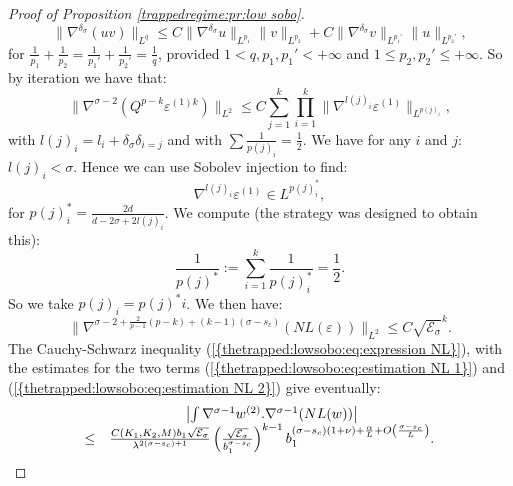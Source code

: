 \documentclass[11pt,a4paper,reqno]{amsart}
\theoremstyle{remark}
\numberwithin{equation}{section}
\begin{document}
\begin{proof}[Proof of Proposition \ref{trappedregime:pr:low sobo}]
$$
\parallel \nabla^{\delta_{\sigma}}(uv)\parallel_{L^q}\leq C \parallel \nabla^{\delta_{\sigma}}u\parallel_{L^{p_1}}\parallel v\parallel_{L^{p_2}}+C\parallel \nabla^{\delta_{\sigma}}v\parallel_{L^{p_1'}}\parallel u\parallel_{L^{p_2'}} ,
$$
for $\frac{1}{p_1}+\frac{1}{p_2}=\frac{1}{p_1'}+\frac{1}{p_2'}=\frac{1}{q}$, provided $1<q,p_1,p_1'<+\infty$ and $1\leq p_2,p_2'\leq +\infty$. So by iteration we have that:
$$
\parallel \nabla^{\sigma-2}(Q^{p-k}\varepsilon^{(1)k} )\parallel_{L^2}\leq C \sum_{j=1}^k \prod_{i=1}^k \parallel \nabla^{l(j)_i}\varepsilon^{(1)} \parallel_{L^{p(j)_i}} ,
$$
with $l(j)_i=l_i+\delta_{\sigma}\delta_{i=j}$ and with $\sum \frac{1}{p(j)_i}=\frac{1}{2}$. We have for any $i$ and $j$: $l(j)_i<\sigma$. Hence we can use Sobolev injection to find:
$$
\nabla^{l(j)_i}\varepsilon^{(1)} \in L^{p(j)^*_i} ,
$$
for $p(j)^*_i=\frac{2d}{d-2\sigma+2l(j)_i}$. We compute (the strategy was designed to obtain this):
$$
\frac{1}{p(j)^*}:=\sum_{i=1}^k \frac{1}{p(j)^*_i}=\frac{1}{2} .
$$
So we take $p(j)_i=p(j)^*i$. We then have:
\begin{equation} \label{thetrapped:lowsobo:eq:estimation NL 2}
\parallel \nabla^{\sigma-2+\frac{2}{p-1}(p-k)+(k-1)(\sigma-s_c)}(NL(\varepsilon)) \parallel_{L^2} \leq C \sqrt{\mathcal{E}_{\sigma}}^k .
\end{equation}
The Cauchy-Schwarz inequality {{\rm (\ref{{thetrapped:lowsobo:eq:expression NL}})}}, with the estimates for the two terms {{\rm (\ref{{thetrapped:lowsobo:eq:estimation NL 1}})}} and {{\rm (\ref{{thetrapped:lowsobo:eq:estimation NL 2}})}} give eventually:
\begin{equation} \label{thetrapped:lowsobo:eq:estimation NL}
\begin{array}{r c l}
&\left| \int \nabla^{\sigma-1}w^{(2)}.\nabla^{\sigma-1}(NL(w))\right| \\
\leq& \frac{C(K_1,K_2,M)b_1\sqrt{\mathcal{E}_{\sigma}}}{\lambda^{2(\sigma-s_c)+1}}\left(\frac{\sqrt{\mathcal{E}_{\sigma}}}{b_1^{\sigma-s_c}} \right)^{k-1}b_1^{(\sigma-s_c)(1+\nu)+\frac{\alpha}{L}+O\left( \frac{\sigma-s_c}{L}\right)} .
\end{array}
\end{equation}


\end{proof}
\end{document}
